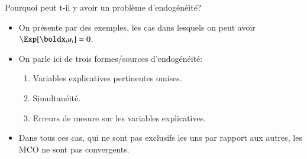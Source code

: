 \begin{frame}[allowframebreaks]{Pourquoi peut t-il y avoir un problème d'endogénéité?}
\begin{itemize}
    \item On présente par des exemples, les cas dans lesquels on peut avoir $\Exp[\boldx_iu_i] = 0$.
    \item On parle ici de trois formes/sources d'endogénéité:
    \begin{enumerate}
        \item Variables explicatives pertinentes omises. 
        \item Simultanéité. 
        \item Erreurs de mesure sur les variables explicatives.
    \end{enumerate}
    \item Dans tous ces cas, qui ne sont pas exclusifs les uns par rapport aux autres, 
    les MCO ne sont pas convergents.
\end{itemize}
\end{frame}

